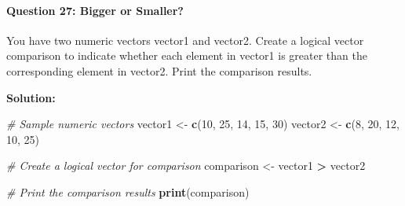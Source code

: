 \documentclass[
]{article}
\newenvironment{Shaded}{\begin{snugshade}}{\end{snugshade}}
\newcommand{\CommentTok}[1]{\textcolor[rgb]{0.56,0.35,0.01}{\textit{#1}}}
\newcommand{\DecValTok}[1]{\textcolor[rgb]{0.00,0.00,0.81}{#1}}
\newcommand{\FunctionTok}[1]{\textcolor[rgb]{0.13,0.29,0.53}{\textbf{#1}}}
\newcommand{\NormalTok}[1]{#1}
\newcommand{\OtherTok}[1]{\textcolor[rgb]{0.56,0.35,0.01}{#1}}
\newcommand{\SpecialCharTok}[1]{\textcolor[rgb]{0.81,0.36,0.00}{\textbf{#1}}}
\begin{document}
\hypertarget{question-27-bigger-or-smaller}{%
\paragraph{Question 27: Bigger or
Smaller?}\label{question-27-bigger-or-smaller}}

You have two numeric vectors vector1 and vector2. Create a logical
vector comparison to indicate whether each element in vector1 is greater
than the corresponding element in vector2. Print the comparison results.

\textbf{Solution:}

\begin{Shaded}
\begin{Highlighting}[]
\CommentTok{\# Sample numeric vectors}
\NormalTok{vector1 }\OtherTok{\textless{}{-}} \FunctionTok{c}\NormalTok{(}\DecValTok{10}\NormalTok{, }\DecValTok{25}\NormalTok{, }\DecValTok{14}\NormalTok{, }\DecValTok{15}\NormalTok{, }\DecValTok{30}\NormalTok{)}
\NormalTok{vector2 }\OtherTok{\textless{}{-}} \FunctionTok{c}\NormalTok{(}\DecValTok{8}\NormalTok{, }\DecValTok{20}\NormalTok{, }\DecValTok{12}\NormalTok{, }\DecValTok{10}\NormalTok{, }\DecValTok{25}\NormalTok{)}

\CommentTok{\# Create a logical vector for comparison}
\NormalTok{comparison }\OtherTok{\textless{}{-}}\NormalTok{ vector1 }\SpecialCharTok{\textgreater{}}\NormalTok{ vector2}

\CommentTok{\# Print the comparison results}
\FunctionTok{print}\NormalTok{(comparison)}
\end{Highlighting}
\end{Shaded}
\end{document}
